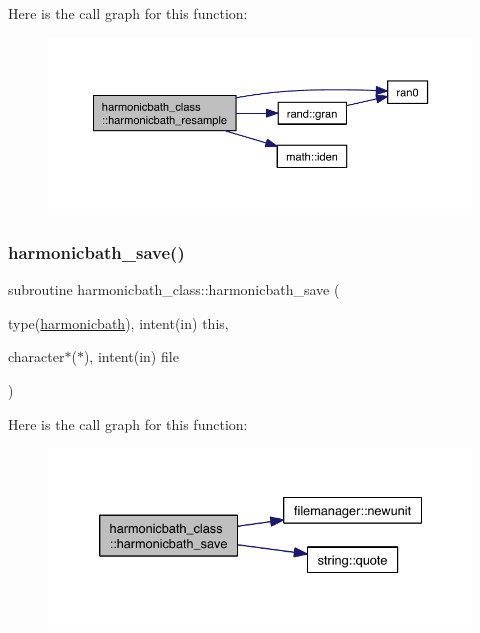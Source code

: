 Here is the call graph for this function\+:\nopagebreak
\begin{figure}[H]
\begin{center}
\leavevmode
\includegraphics[width=350pt]{namespaceharmonicbath__class_a6b27afcc7c1f24fec82adf3177d0adb8_cgraph}
\end{center}
\end{figure}
\mbox{\label{namespaceharmonicbath__class_a9dfb6e87e69957fcc4ec907135931ace}} 
\subsubsection{\texorpdfstring{harmonicbath\+\_\+save()}{harmonicbath\_save()}}
{\footnotesize\ttfamily subroutine harmonicbath\+\_\+class\+::harmonicbath\+\_\+save (\begin{DoxyParamCaption}\item[{type(\hyperlink{structharmonicbath__class_1_1harmonicbath}{harmonicbath}), intent(in)}]{this,  }\item[{character$\ast$($\ast$), intent(in)}]{file }\end{DoxyParamCaption})\hspace{0.3cm}{\ttfamily [private]}}

Here is the call graph for this function\+:\nopagebreak
\begin{figure}[H]
\begin{center}
\leavevmode
\includegraphics[width=334pt]{namespaceharmonicbath__class_a9dfb6e87e69957fcc4ec907135931ace_cgraph}
\end{center}
\end{figure}
\mbox{\label{namespaceharmonicbath__class_ac930ca08461d767f4593374465c7229d}} 
